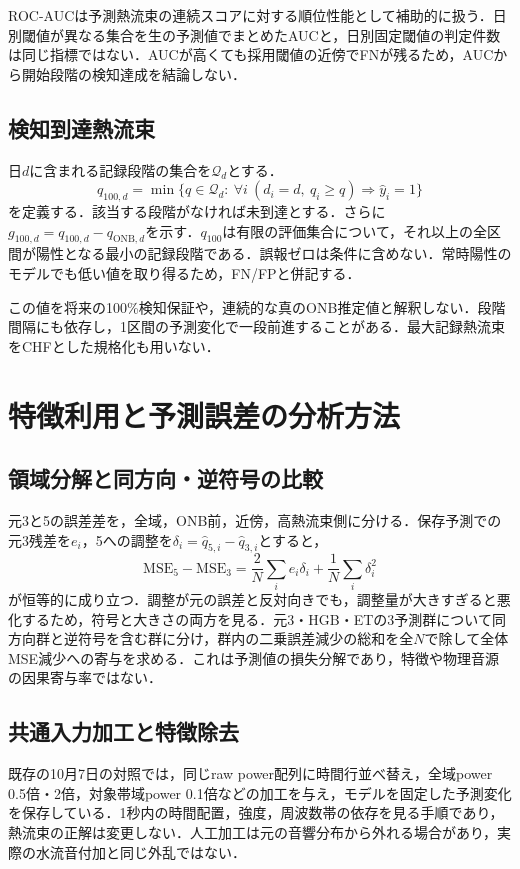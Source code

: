 ROC-AUCは予測熱流束の連続スコアに対する順位性能として補助的に扱う．日別閾値が異なる集合を生の予測値でまとめたAUCと，日別固定閾値の判定件数は同じ指標ではない．AUCが高くても採用閾値の近傍でFNが残るため，AUCから開始段階の検知達成を結論しない．

\subsection{検知到達熱流束}
日$d$に含まれる記録段階の集合を$\mathcal Q_d$とする．
\begin{equation}\label{eq:q100}
 q_{100,d}=\min\{q\in\mathcal Q_d:\ \forall i\ (d_i=d,\ q_i\ge q)\Rightarrow\hat y_i=1\}
\end{equation}
を定義する．該当する段階がなければ未到達とする．さらに$g_{100,d}=q_{100,d}-q_{\mathrm{ONB},d}$を示す．$q_{100}$は有限の評価集合について，それ以上の全区間が陽性となる最小の記録段階である．誤報ゼロは条件に含めない．常時陽性のモデルでも低い値を取り得るため，FN/FPと併記する．

この値を将来の100\%検知保証や，連続的な真のONB推定値と解釈しない．段階間隔にも依存し，1区間の予測変化で一段前進することがある．最大記録熱流束をCHFとした規格化も用いない．

\section{特徴利用と予測誤差の分析方法}
\subsection{領域分解と同方向・逆符号の比較}
元3と5の誤差差を，全域，ONB前，近傍，高熱流束側に分ける．保存予測での元3残差を$e_i$，5への調整を$\delta_i=\hat q_{5,i}-\hat q_{3,i}$とすると，
\begin{equation}\label{eq:decomp}
 \mathrm{MSE}_5-\mathrm{MSE}_3
 =\frac{2}{N}\sum_i e_i\delta_i+\frac{1}{N}\sum_i\delta_i^2
\end{equation}
が恒等的に成り立つ．調整が元の誤差と反対向きでも，調整量が大きすぎると悪化するため，符号と大きさの両方を見る．元3・HGB・ETの3予測群について同方向群と逆符号を含む群に分け，群内の二乗誤差減少の総和を全$N$で除して全体MSE減少への寄与を求める．これは予測値の損失分解であり，特徴や物理音源の因果寄与率ではない．

\subsection{共通入力加工と特徴除去}
既存の10月7日の対照\cite{localInput}では，同じraw power配列に時間行並べ替え，全域power 0.5倍・2倍，対象帯域power 0.1倍などの加工を与え，モデルを固定した予測変化を保存している．1秒内の時間配置，強度，周波数帯の依存を見る手順であり，熱流束の正解は変更しない．人工加工は元の音響分布から外れる場合があり，実際の水流音付加と同じ外乱ではない．

